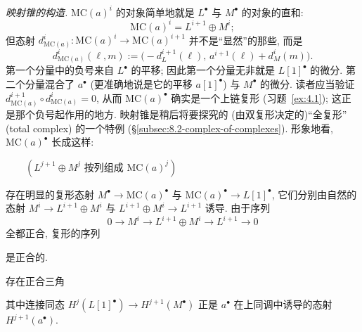 \indent \emph{映射锥的构造.} $\mathrm{MC}(a)^i$ 的对象简单地就是 $L^\bullet$ 与 $M^\bullet$ 的对象的直和:
\[
\mathrm{MC}(a)^i=L^{i+1}\oplus M^i;
\]
但态射 $d_{\mathrm{MC}(a)}^i:\mathrm{MC}(a)^i\to\mathrm{MC}(a)^{i+1}$ 并不是``显然''的那些, 而是
\[
d_{\mathrm{MC}(a)}^i(\ell,m):=\bigl(-d_L^{i+1}(\ell),\, a^{i+1}(\ell)+d_M^i(m)\bigr).
\]
第一个分量中的负号来自 $L^\bullet$ 的平移; 因此第一个分量无非就是 $L[1]^\bullet$ 的微分. 第二个分量混合了 $a^\bullet$ (更准确地说是它的平移 $a[1]^\bullet$) 与 $M^\bullet$ 的微分. 读者应当验证 $d_{\mathrm{MC}(a)}^{i+1}\circ d_{\mathrm{MC}(a)}^i=0$, 从而 $\mathrm{MC}(a)^\bullet$ 确实是一个上链复形 (习题~\ref{ex:4.1}); 这正是那个负号起作用的地方. 映射锥是稍后将要探究的 (由双复形决定的)``全复形'' (total complex) 的一个特例 (\S\ref{subsec:8.2-complex-of-complexes}).
形象地看, $\mathrm{MC}(a)^\bullet$ 长成这样:
\begin{center}
\(\qquad (L^{j+1}\oplus M^j\text{ 按列组成 }\mathrm{MC}(a)^j)\)
\end{center}
存在明显的复形态射 $M^\bullet\to\mathrm{MC}(a)^\bullet$ 与 $\mathrm{MC}(a)^\bullet\to L[1]^\bullet$, 它们分别由自然的态射 $M^i\to L^{i+1}\oplus M^i$ 与 $L^{i+1}\oplus M^i\to L^{i+1}$ 诱导. 由于序列
\[
0\longrightarrow M^i\longrightarrow L^{i+1}\oplus M^i\longrightarrow L^{i+1}\longrightarrow 0
\]
全都正合, 复形的序列
\begin{center}
\end{center}
是正合的.

\begin{proposition}\label{prop:4.1-exact-triangle}
存在正合三角
\begin{center}
\end{center}
其中连接同态 $H^j(L[1]^\bullet)\to H^{j+1}(M^\bullet)$ 正是 $a^\bullet$ 在上同调中诱导的态射 $H^{j+1}(a^\bullet)$.
\end{proposition}

